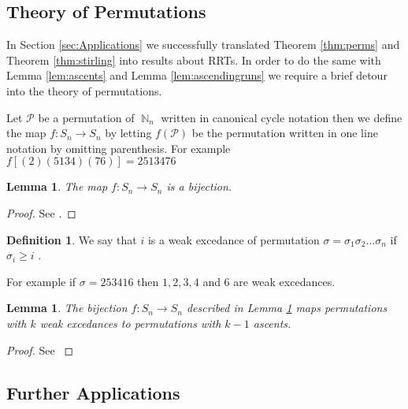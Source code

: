 \documentclass[oneside]{book} %
\newtheorem{lem}[thm]{Lemma}
\theoremstyle{definition}
\newtheorem{defn}[thm]{Definition}
\numberwithin{equation}{section}
\DeclareMathOperator{\N}{\mathbb{N}}
\begin{document}
\subsection{Theory of Permutations}
In Section \ref{sec:Applications} we successfully translated Theorem \ref{thm:perms} and Theorem \ref{thm:stirling} into
results about RRTs. In order to do the same with Lemma \ref{lem:ascents} and Lemma \ref{lem:ascendingruns} we require a brief detour
into the theory of permutations.  

Let $\mathcal{P}$ be a permutation of $\N_n$ written in canonical cycle notation then we define the map 
$f: S_n \rightarrow S_n$ by letting $f(\mathcal{P})$ be the permutation written in one line notation by omitting parenthesis. 
For example $f[(2)(5134)(76)] = 2513476$ 
\begin{lem}\label{lem:bijection}
The map $f: S_n \rightarrow S_n$ is a bijection. 
\end{lem}
\begin{proof}
 See \cite{Bona}.
\end{proof}

\begin{defn}
 We say that $i$ is a weak excedance of permutation $\sigma = \sigma_1\sigma_2\dots \sigma_n$ if $\sigma_i \geq i$ \cite{Bona}.     
\end{defn}
For example if $\sigma = 253416$ then $1,2,3,4$ and 6 are weak excedances. 

\begin{lem}
 The bijection $f: S_n \rightarrow S_n$ described in Lemma \ref{lem:bijection} maps permutations with $k$ weak excedances
 to permutations with $k-1$ ascents.  
\end{lem}
\begin{proof}
 See \cite{Bona}
\end{proof}




\subsection{Further Applications}
\end{document}
